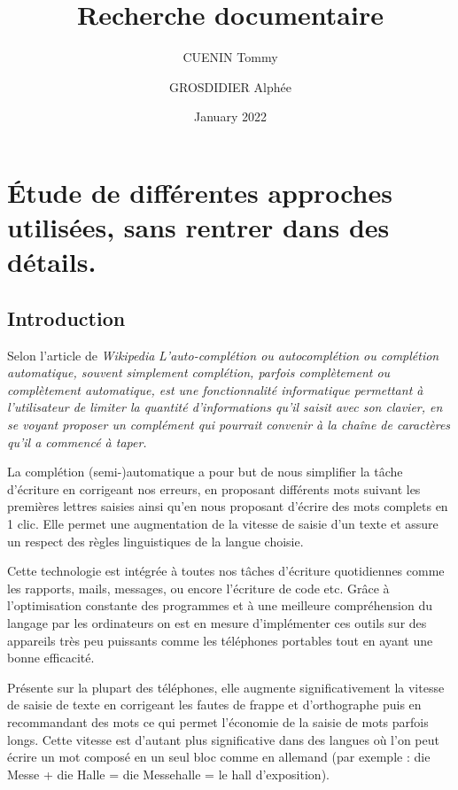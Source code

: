 \documentclass[final, 10pt]{report}
\title{Recherche documentaire}
\author{CUENIN Tommy\and GROSDIDIER Alphée}
\date{January 2022}
\begin{document}
\maketitle

\tableofcontents

\chapter{Étude de différentes approches utilisées, sans rentrer dans des détails.}
\section{Introduction}
    Selon l'article de \emph{Wikipedia} \cite{noauthor_auto-completion_2019} \og\emph{L'auto-complétion ou autocomplétion ou complétion automatique, souvent simplement complétion, parfois complètement ou complètement automatique, est une fonctionnalité informatique permettant à l'utilisateur de limiter la quantité d'informations qu'il saisit avec son clavier, en se voyant proposer un complément qui pourrait convenir à la chaîne de caractères qu'il a commencé à taper.}\fg{}
    
    La complétion (semi-)automatique a pour but de nous simplifier la tâche d'écriture en corrigeant nos erreurs, en proposant différents mots suivant les premières lettres saisies ainsi qu'en nous proposant d'écrire des mots complets en 1 clic. 
    Elle permet une augmentation de la vitesse de saisie d'un texte et assure un respect des règles linguistiques de la langue choisie.
    
    Cette technologie est intégrée à toutes nos tâches d'écriture quotidiennes comme les rapports, mails, messages, ou encore l'écriture de code etc. Grâce à l'optimisation constante des programmes et à une meilleure compréhension du langage par les ordinateurs on est en mesure d'implémenter ces outils sur des appareils très peu puissants comme les téléphones portables tout en ayant une bonne efficacité.
    
    Présente sur la plupart des téléphones, elle augmente significativement la vitesse de saisie de texte en corrigeant les fautes de frappe et d'orthographe puis en recommandant des mots ce qui permet l'économie de la saisie de mots parfois longs. Cette vitesse est d'autant plus significative dans des langues où l'on peut écrire un mot composé en un seul bloc comme en allemand (par exemple :  die Messe + die Halle = die Messehalle  =  le hall d'exposition).
\end{document}
